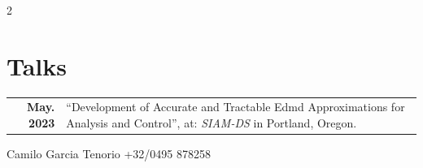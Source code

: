 \documentclass[11pt,a4paper,grey]{hipstercv}
\newlength{\rightcolwidth}
\begin{document}
\begin{paracol}{2}
\begin{minipage}[t]{0.3\textwidth}
		\section*{Talks}
		\begin{tabular}{>{\footnotesize\bfseries}r >{\footnotesize}p{}}
			May. 2023 & ``Development of Accurate and Tractable Edmd Approximations for Analysis and Control'', at: \emph{SIAM-DS} in Portland, Oregon.
		\end{tabular}
	\end{minipage}









	\vfill{} %

	\setlength{\parindent}{0pt}
	\begin{minipage}[t]{\rightcolwidth}
		\begin{center}\fontfamily{\sfdefault}\selectfont \color{black!70}
			{\small Camilo Garcia Tenorio\href{mailto:camilo_7@msn.com}{} \href{https://www.linkedin.com/in/camilo-garcia-tenorio-08813740/}{} \href{https://github.com/garten-cam}{} +32/0495 878258}
		\end{center}
	\end{minipage}


\end{paracol}
\end{document}
